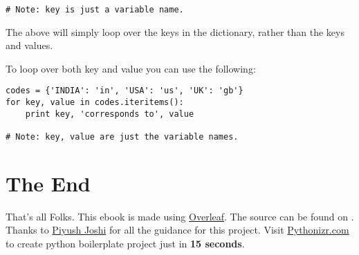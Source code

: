 \documentclass[a4paper,9pt]{extarticle}
\begin{document}
\begin{multicols*}{2}
\begin{lstlisting}
# Note: key is just a variable name.
\end{lstlisting}
The above will simply loop over the keys in the dictionary, rather than the keys and values.

To loop over both key and value you can use the following:
\begin{lstlisting}
codes = {'INDIA': 'in', 'USA': 'us', 'UK': 'gb'}
for key, value in codes.iteritems():
    print key, 'corresponds to', value

# Note: key, value are just the variable names.
\end{lstlisting}

\section{The End}
That's all Folks.\newline
This ebook is made using \href{https://overleaf.com}{Overleaf}. \newline The source can be found on \href{https://github.com/akashp1712/python_cheat_sheets}{\LARGE{\faGithub}}. \newline
Thanks to \faLinkedin{} \href{https://www.linkedin.com/in/piyush-joshi-b7525216/}{Piyush Joshi} for all the guidance for this project. \newline
Visit \href{http://pythonizr.com}{Pythonizr.com} to create python boilerplate project just in \textbf{15 seconds}.

\end{multicols*}
\end{document}
